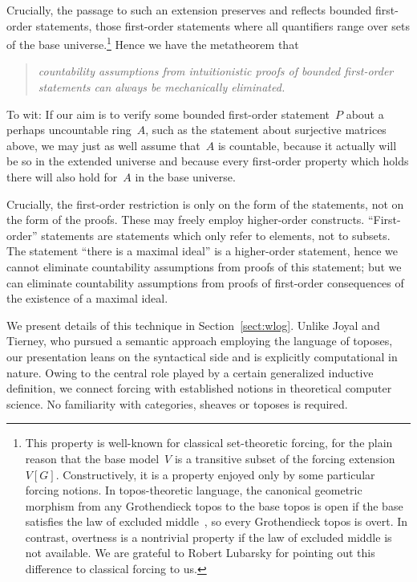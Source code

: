 \documentclass[com,11pt,crcready]{iosart2x}
\theoremstyle{definition}
\theoremstyle{plain}
\theoremstyle{remark}
\newcommand{\?}{\,{:}\,}
\renewcommand{\_}{\mathpunct{.}\,}
\begin{document}
Crucially, the passage to such an extension preserves and reflects
bounded first-order statements, those first-order statements where all
quantifiers range over sets of the base universe.\footnote{This property is well-known for classical
set-theoretic forcing, for the plain reason that the base model~$V$ is a
transitive subset of the forcing extension~$V[G]$. Constructively, it is a property enjoyed only by some
particular forcing notions. In topos-theoretic language, the canonical
geometric morphism from any Grothendieck topos to the base topos is open
if the base satisfies the law of excluded middle~\cite[p.~57]{joyal-tierney:grothendieck}, so every Grothendieck topos is
overt. In contrast, overtness is a nontrivial property if the law of excluded
middle is not available. We are grateful to Robert Lubarsky for pointing out
this difference to classical forcing to us.}
Hence we have the metatheorem that
\begin{quote}\emph{countability
assumptions from intuitionistic proofs of bounded first-order statements can always be
mechanically eliminated.}\end{quote}
To wit: If our aim is to verify some bounded first-order
statement~$P$ about a perhaps uncountable ring~$A$, such as the statement about
surjective matrices above, we may just as well assume that~$A$ is countable,
because it actually will be so in the extended universe and because every
first-order property which holds there will also hold for~$A$ in the base
universe.

Crucially, the first-order restriction is only on the form
of the statements, not on the form of the proofs. These may freely employ higher-order constructs.
``First-order'' statements are statements which only refer to elements, not to
subsets. The statement ``there is a maximal ideal'' is a higher-order
statement, hence we cannot eliminate countability assumptions from proofs of
this statement; but we can eliminate countability assumptions from proofs of
first-order consequences of the existence of a maximal ideal.

We present details of this technique in Section~\ref{sect:wlog}. Unlike
Joyal and Tierney, who pursued a semantic approach employing the language of
toposes, our presentation leans on the syntactical side and is explicitly computational in
nature. Owing to the central role played by a certain generalized inductive definition, we connect forcing
with established notions in theoretical computer science.
No familiarity with categories, sheaves or toposes is required.
\end{document}
